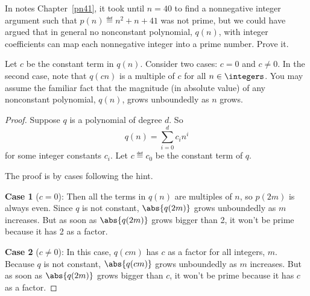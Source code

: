\documentclass[handout]{mcs}
\begin{document}
\begin{problem}
  In notes Chapter~\ref{pn41}, it took until $n=40$ to find a nonnegative
  integer argument such that $p(n) \eqdef n^2 + n + 41$ was not prime, but
  we could have argued that in general no nonconstant polynomial, $q(n)$,
  with integer coefficients can map each nonnegative integer into a prime
  number.  Prove it.

  \hint Let $c$ be the constant term in $q(n)$.  Consider two cases: $c=0$
  and $c \neq 0$.  In the second case, note that $q(cn)$ is a multiple of
  $c$ for all $n \in \integers$.  You may assume the familiar fact that
  the magnitude (in absolute value) of any nonconstant polynomial, $q(n)$,
  grows unboundedly as $n$ grows.
 
\begin{solution}
\begin{proof}
Suppose $q$ is a polynomial of degree $d$. So
\[
q(n) = \sum_{i=0}^d c_in^i
\]
for some integer constants $c_i$.  Let $c \eqdef c_0$ be the constant term
of $q$.

The proof is by cases following the hint.  

\textbf{Case 1} ($c = 0$): Then all the terms in $q(n)$ are multiples of
$n$, so $p(2m)$ is always even.  Since $q$ is not constant, $\abs{q(2m)}$
grows unboundedly as $m$ increases.  But as soon as $\abs{q(2m)}$
grows bigger than 2, it won't be prime because it has 2 as a factor.

\textbf{Case 2} ($c \neq 0$): In this case, $q(cm)$ has $c$ as a factor
for all integers, $m$.  Because $q$ is not constant, $\abs{q(cm)}$
grows unboundedly as $m$ increases.  But as soon as $\abs{q(2m)}$
grows bigger than $c$, it won't be prime because it has $c$ as a factor.
\end{proof}

\end{solution}

\end{problem}
\end{document}
